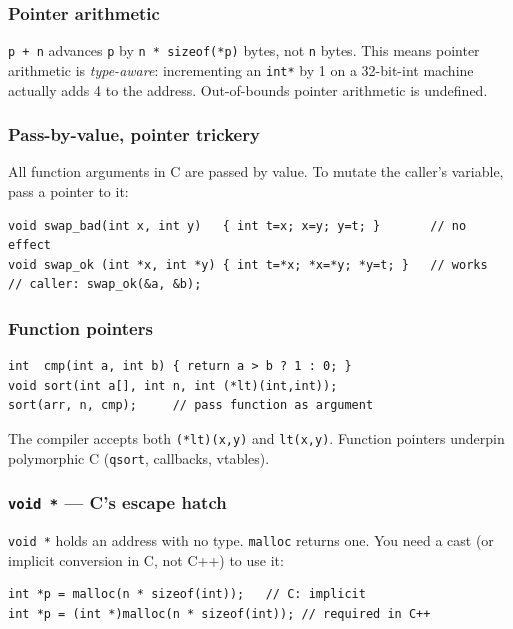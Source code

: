 \documentclass[11pt,a4paper]{article}
\begin{document}
\subsubsection*{Pointer arithmetic}

\verb|p + n| advances \verb|p| by \verb|n * sizeof(*p)| bytes, not \verb|n| bytes. This means pointer arithmetic is \emph{type-aware}: incrementing an \verb|int*| by 1 on a 32-bit-int machine actually adds 4 to the address. Out-of-bounds pointer arithmetic is undefined.

\subsubsection*{Pass-by-value, pointer trickery}

All function arguments in C are passed by value. To mutate the caller's variable, pass a pointer to it:

\begin{lstlisting}
void swap_bad(int x, int y)   { int t=x; x=y; y=t; }       // no effect
void swap_ok (int *x, int *y) { int t=*x; *x=*y; *y=t; }   // works
// caller: swap_ok(&a, &b);
\end{lstlisting}

\subsubsection*{Function pointers}

\begin{lstlisting}
int  cmp(int a, int b) { return a > b ? 1 : 0; }
void sort(int a[], int n, int (*lt)(int,int));
sort(arr, n, cmp);     // pass function as argument
\end{lstlisting}
The compiler accepts both \verb|(*lt)(x,y)| and \verb|lt(x,y)|. Function pointers underpin polymorphic C (\verb|qsort|, callbacks, vtables).

\subsubsection*{\texttt{void *} --- C's escape hatch}

\verb|void *| holds an address with no type. \verb|malloc| returns one. You need a cast (or implicit conversion in C, not C++) to use it:
\begin{lstlisting}
int *p = malloc(n * sizeof(int));   // C: implicit
int *p = (int *)malloc(n * sizeof(int)); // required in C++
\end{lstlisting}
\end{document}
